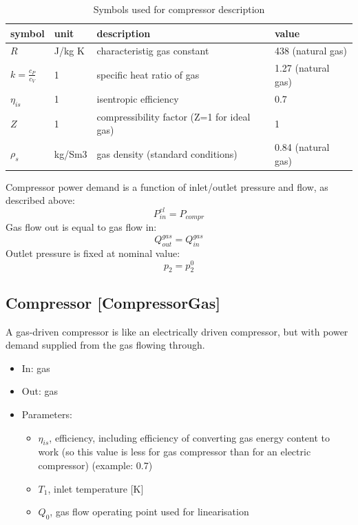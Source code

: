 \documentclass[12pt]{article}
\begin{document}
\begin{table}[]
\caption{Symbols used for compressor description}
\label{tab:compressorsymbols}
\begin{tabular}{llp{12em}l}
\hline
symbol    		& unit   & description                                & value              \\
\hline
$R$         		& J/kg K & characteristig gas constant                & 438 (natural gas)  \\
$k=\frac{c_P}{c_V}$ & 1      & specific heat ratio of gas                 & 1.27 (natural gas) \\
$\eta_{is}$      & 1      & isentropic efficiency                      & 0.7                \\
$Z$         		& 1      & compressibility factor (Z=1 for ideal gas) & 1                  \\
$\rho_s$		& kg/Sm3 & gas density (standard conditions)          & 0.84 (natural gas) \\
\hline
\end{tabular}
\end{table}


Compressor power demand is a function of inlet/outlet pressure and flow, as described above:
 \begin{equation}
 	 P^{el}_{in}=P_{compr} 
\end{equation} 
Gas flow out is equal to gas flow in:
\begin{equation}
	 Q_{out}^{gas}=Q_{in}^{gas}
\end{equation} 
Outlet pressure is fixed at nominal value:
\begin{equation}
	p_{2}=p_{2}^{0} 
\end{equation}


\subsection{Compressor [CompressorGas]}

A gas-driven compressor is like an electrically driven compressor, but with power demand supplied from the gas flowing through.


\begin{itemize}
\item In: gas
\item Out: gas
\item Parameters:
\begin{itemize}[noitemsep,topsep=0pt]
	\item $\eta_{is}$,  efficiency, including efficiency of converting gas energy content to work (so this value is less for gas compressor than for an electric compressor) (example: 0.7)
	\item $T_1$, inlet temperature [K]
	\item $Q_0$, gas flow operating point used for linearisation
\end{itemize}
\end{itemize}
\end{document}
